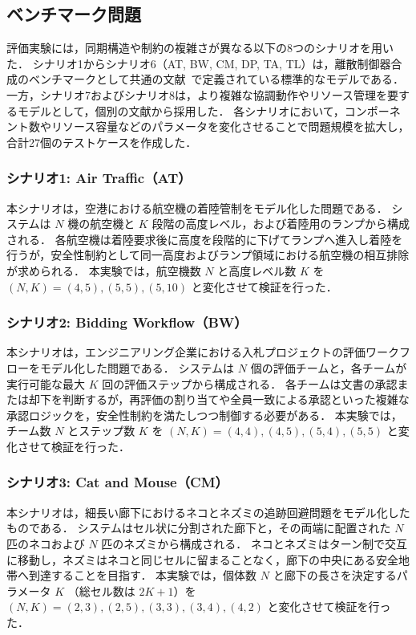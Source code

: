 \documentclass[a4paper,11pt,oneside,openany,report,dvipdfmx]{jsbook}
\begin{document}
\subsection{ベンチマーク問題}

評価実験には，同期構造や制約の複雑さが異なる以下の8つのシナリオを用いた．
シナリオ1からシナリオ6（AT, BW, CM, DP, TA, TL）は，離散制御器合成のベンチマークとして共通の文献~\cite{6Scenarios}で定義されている標準的なモデルである．
一方，シナリオ7およびシナリオ8は，より複雑な協調動作やリソース管理を要するモデルとして，個別の文献から採用した．
各シナリオにおいて，コンポーネント数やリソース容量などのパラメータを変化させることで問題規模を拡大し，合計27個のテストケースを作成した．

\subsubsection{シナリオ1: Air Traffic（AT）}

本シナリオは，空港における航空機の着陸管制をモデル化した問題である．
システムは $N$ 機の航空機と $K$ 段階の高度レベル，および着陸用のランプから構成される．
各航空機は着陸要求後に高度を段階的に下げてランプへ進入し着陸を行うが，安全性制約として同一高度およびランプ領域における航空機の相互排除が求められる．
本実験では，航空機数 $N$ と高度レベル数 $K$ を $(N, K) = (4, 5), (5, 5), (5, 10)$ と変化させて検証を行った．

\subsubsection{シナリオ2: Bidding Workflow（BW）}

本シナリオは，エンジニアリング企業における入札プロジェクトの評価ワークフローをモデル化した問題である．
システムは $N$ 個の評価チームと，各チームが実行可能な最大 $K$ 回の評価ステップから構成される．
各チームは文書の承認または却下を判断するが，再評価の割り当てや全員一致による承認といった複雑な承認ロジックを，安全性制約を満たしつつ制御する必要がある．
本実験では，チーム数 $N$ とステップ数 $K$ を $(N, K) = (4, 4), (4, 5), (5, 4), (5, 5)$ と変化させて検証を行った．

\subsubsection{シナリオ3: Cat and Mouse（CM）}

本シナリオは，細長い廊下におけるネコとネズミの追跡回避問題をモデル化したものである．
システムはセル状に分割された廊下と，その両端に配置された $N$ 匹のネコおよび $N$ 匹のネズミから構成される．
ネコとネズミはターン制で交互に移動し，ネズミはネコと同じセルに留まることなく，廊下の中央にある安全地帯へ到達することを目指す．
本実験では，個体数 $N$ と廊下の長さを決定するパラメータ $K$ （総セル数は $2K+1$）を $(N, K) = (2, 3), (2, 5), (3, 3), (3, 4), (4, 2)$ と変化させて検証を行った．
\end{document}
